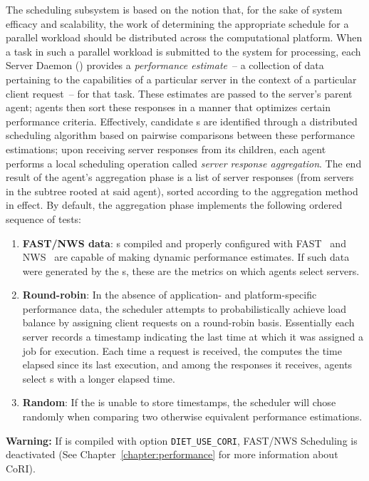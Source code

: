 The \diet scheduling subsystem is based on the notion that, for the
sake of system efficacy and scalability, the work of determining the
appropriate schedule for a parallel workload should be distributed
across the computational platform.  When a task in such a parallel
workload is submitted to the system for processing, each Server Daemon
(\sed) provides a \emph{performance estimate}~-- a collection of data
pertaining to the capabilities of a particular server in the context
of a particular client request~-- for that task.  These estimates are
passed to the server's parent agent; agents then sort these responses
in a manner that optimizes certain performance criteria.  Effectively,
candidate {\sed}s are identified through a distributed scheduling
algorithm based on pairwise comparisons between these performance
estimations; upon receiving server responses from its children, each
agent performs a local scheduling operation called \emph{server
response aggregation}.  The end result of the agent's aggregation
phase is a list of server responses (from servers in the subtree
rooted at said agent), sorted according to the aggregation method in
effect.  By default, the aggregation phase implements the following
ordered sequence of tests:

\begin{enumerate}
\item \textbf{FAST/NWS data}: {\sed}s compiled and properly configured
  with FAST~\cite{Qui02} and NWS~\cite{WSH99} are capable of making
  dynamic performance estimates.  If such data were generated by the
  {\sed}s, these are the metrics on which agents select servers.
\item \textbf{Round-robin}: In the absence of application- and
  platform-specific performance data, the \diet scheduler attempts to
  probabilistically achieve load balance by assigning client requests
  on a round-robin basis.  Essentially each server records a timestamp
  indicating the last time at which it was assigned a job for
  execution.  Each time a request is received, the \sed computes the
  time elapsed since its last execution, and among the responses it
  receives, \diet agents select {\sed}s with a longer elapsed time.
\item \textbf{Random}: If the {\sed} is unable to store timestamps, the
  \diet scheduler will chose randomly when comparing two otherwise
  equivalent {\sed} performance estimations.
\end{enumerate}

\textbf{Warning:} If \diet is compiled with option \texttt{DIET\_USE\_CORI},
FAST/NWS Scheduling is deactivated (See
Chapter~\ref{chapter:performance} for more information about CoRI).

